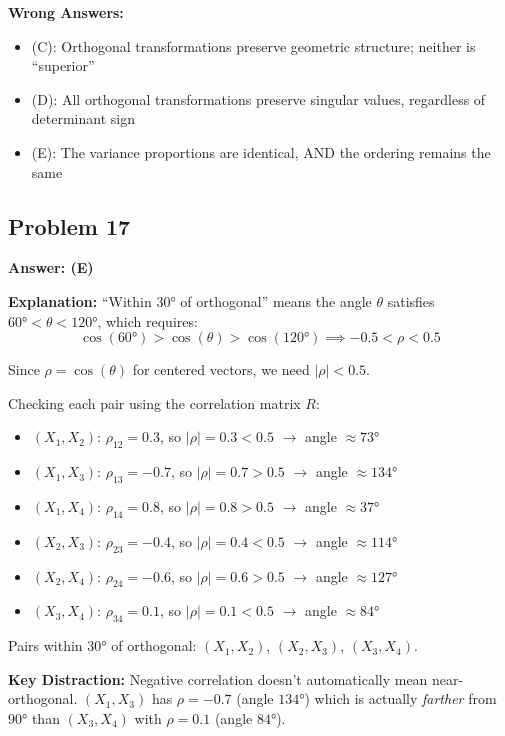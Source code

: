\documentclass[12pt]{amsart}
\newcommand{\correct}[1]{{\color{correctgreen}\textbf{#1}}}
\begin{document}
\begin{itemize}
\textbf{Wrong Answers:}
\begin{itemize}
\item (C): Orthogonal transformations preserve geometric structure; neither is ``superior''
\item (D): All orthogonal transformations preserve singular values, regardless of determinant sign
\item (E): The variance proportions are identical, AND the ordering remains the same
\end{itemize}

\subsection*{Problem 17}
\correct{Answer: (E)}

\textbf{Explanation:} ``Within $30°$ of orthogonal'' means the angle $\theta$ satisfies $60° < \theta < 120°$, which requires:
$$\cos(60°) > \cos(\theta) > \cos(120°) \implies -0.5 < \rho < 0.5$$

Since $\rho = \cos(\theta)$ for centered vectors, we need $|\rho| < 0.5$.

Checking each pair using the correlation matrix $R$:
\begin{itemize}
\item $(X_1, X_2)$: $\rho_{12} = 0.3$, so $|\rho| = 0.3 < 0.5$ $\to$ angle $\approx 73°$ \checkmark
\item $(X_1, X_3)$: $\rho_{13} = -0.7$, so $|\rho| = 0.7 > 0.5$ $\to$ angle $\approx 134°$ 
\item $(X_1, X_4)$: $\rho_{14} = 0.8$, so $|\rho| = 0.8 > 0.5$ $\to$ angle $\approx 37°$ 
\item $(X_2, X_3)$: $\rho_{23} = -0.4$, so $|\rho| = 0.4 < 0.5$ $\to$ angle $\approx 114°$ \checkmark
\item $(X_2, X_4)$: $\rho_{24} = -0.6$, so $|\rho| = 0.6 > 0.5$ $\to$ angle $\approx 127°$ 
\item $(X_3, X_4)$: $\rho_{34} = 0.1$, so $|\rho| = 0.1 < 0.5$ $\to$ angle $\approx 84°$ \checkmark
\end{itemize}

Pairs within $30°$ of orthogonal: $(X_1, X_2)$, $(X_2, X_3)$, $(X_3, X_4)$.

\textbf{Key Distraction:} Negative correlation doesn't automatically mean near-orthogonal. $(X_1, X_3)$ has $\rho = -0.7$ (angle $134°$) which is actually \textit{farther} from $90°$ than $(X_3, X_4)$ with $\rho = 0.1$ (angle $84°$).


\end{itemize}
\end{document}
